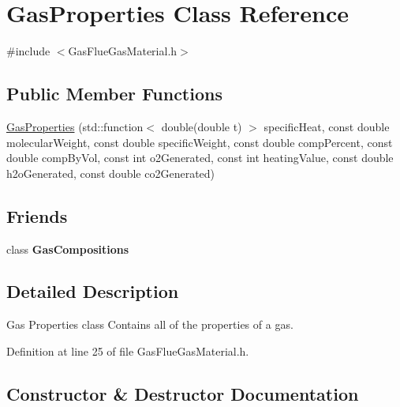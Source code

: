 \hypertarget{class_gas_properties}{}\section{Gas\+Properties Class Reference}
\label{class_gas_properties}


{\ttfamily \#include $<$Gas\+Flue\+Gas\+Material.\+h$>$}

\subsection*{Public Member Functions}
\begin{DoxyCompactItemize}
\item 
\hyperlink{class_gas_properties_a95b506951beca31785d5207ff744ead9}{Gas\+Properties} (std\+::function$<$ double(double t) $>$ specific\+Heat, const double molecular\+Weight, const double specific\+Weight, const double comp\+Percent, const double comp\+By\+Vol, const int o2\+Generated, const int heating\+Value, const double h2o\+Generated, const double co2\+Generated)
\end{DoxyCompactItemize}
\subsection*{Friends}
\begin{DoxyCompactItemize}
\item 
\mbox{\label{class_gas_properties_a06c8fecbbd02620ff1ebf3d1cb48d14a}} 
class {\bfseries Gas\+Compositions}
\end{DoxyCompactItemize}


\subsection{Detailed Description}
Gas Properties class Contains all of the properties of a gas. 

Definition at line 25 of file Gas\+Flue\+Gas\+Material.\+h.



\subsection{Constructor \& Destructor Documentation}
\mbox{\label{class_gas_properties_a95b506951beca31785d5207ff744ead9}} 
